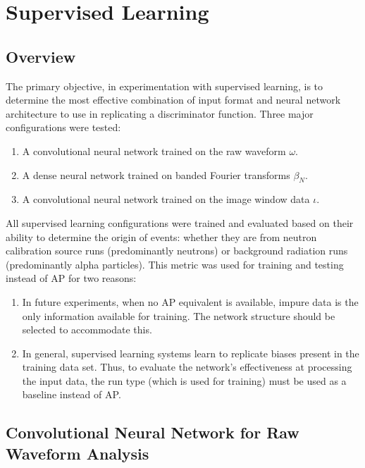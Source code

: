 \documentclass[10pt]{article}
\begin{document}
\section{Supervised Learning}

\subsection{Overview}

The primary objective, in experimentation with supervised learning, is to determine the most effective combination of input format and neural network architecture to use in replicating a discriminator function. Three major configurations were tested:

\begin{enumerate}
    \item A convolutional neural network trained on the raw waveform $\omega$.
    \item A dense neural network trained on banded Fourier transforms $\beta_{N}$.
    \item A convolutional neural network trained on the image window data $\iota$.
\end{enumerate}

All supervised learning configurations were trained and evaluated based on their ability to determine the origin of events: whether they are from neutron calibration source runs (predominantly neutrons) or background radiation runs (predominantly alpha particles). This metric was used for training and testing instead of AP for two reasons:

\begin{enumerate}
    \item In future experiments, when no AP equivalent is available, impure data is the only information available for training. The network structure should be selected to accommodate this.
    \item In general, supervised learning systems learn to replicate biases present in the training data set. Thus, to evaluate the network's effectiveness at processing the input data, the run type (which is used for training) must be used as a baseline instead of AP.
\end{enumerate}

\subsection{Convolutional Neural Network for Raw Waveform Analysis}
\end{document}
